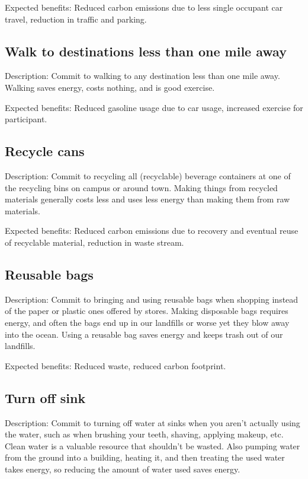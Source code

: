 Expected benefits: Reduced carbon emissions due to less single occupant car travel, reduction in traffic and parking.


\subsection{Walk to destinations less than one mile away}

Description: Commit to walking to any destination less than one mile away. Walking saves energy, costs nothing, and is good exercise.

Expected benefits: Reduced gasoline usage due to car usage, increased exercise for participant.


\subsection{Recycle cans}

Description: Commit to recycling all (recyclable) beverage containers at one of the recycling bins on campus or around town. Making things from recycled materials generally costs less and uses less energy than making them from raw materials.

Expected benefits: Reduced carbon emissions due to recovery and eventual reuse of recyclable material, reduction in waste stream.


\subsection{Reusable bags}

Description: Commit to bringing and using reusable bags when shopping instead of the paper or plastic ones offered by stores. Making disposable bags requires energy, and often the bags end up in our landfills or worse yet they blow away into the ocean. Using a reusable bag saves energy and keeps trash out of our landfills.

Expected benefits: Reduced waste, reduced carbon footprint.


\subsection{Turn off sink}

Description: Commit to turning off water at sinks when you aren't actually using the water, such as when brushing your teeth, shaving, applying makeup, etc. Clean water is a valuable resource that shouldn't be wasted. Also pumping water from the ground into a building, heating it, and then treating the used water takes energy, so reducing the amount of water used saves energy.

